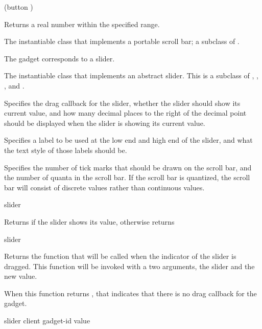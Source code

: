 {(button )}

Returns a real number within the specified range.


The instantiable class that implements a portable scroll bar; a subclass of
.



The  gadget corresponds to a slider.


The instantiable class that implements an abstract slider.  This is a subclass
of , , , and
.


Specifies the drag callback for the slider, whether the slider should show its
current value, and how many decimal places to the right of the decimal point
should be displayed when the slider is showing its current value.


Specifies a label to be used at the low end and high end of the slider, and what
the text style of those labels should be.


Specifies the number of tick marks that should be drawn on the scroll bar, and
the number of quanta in the scroll bar.  If the scroll bar is quantized, the
scroll bar will consist of discrete values rather than continuous values.

 {slider}

Returns  if the slider shows its value, otherwise returns 

 {slider}

Returns the function that will be called when the indicator of the slider is
dragged.  This function will be invoked with a two arguments, the slider and the
new value.

When this function returns , that indicates that there is no drag
callback for the gadget.

 {slider client gadget-id value}

